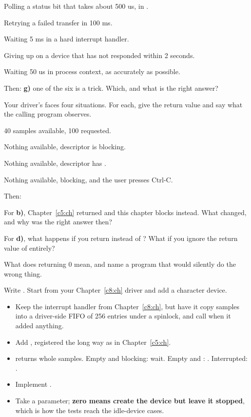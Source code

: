  Polling a status bit that takes about 500 us, in .

 Retrying a failed transfer in 100 ms.

 Waiting 5 ms in a hard interrupt handler.

 Giving up on a device that has not responded within 2 seconds.

 Waiting 50 us in process context, as accurately as possible.

Then: \textbf{g)} one of the six is a trick. Which, and what is the right answer?

\label{c9:ex:5}

Your driver's  faces four situations. For each, give the return value and say what the
calling program observes.

 40 samples available, 100 requested.

 Nothing available, descriptor is blocking.

 Nothing available, descriptor has .

 Nothing available, blocking, and the user presses Ctrl-C.

Then:

 For \textbf{b)}, Chapter~\ref{c5:ch} returned  and this chapter blocks
instead. What changed, and why was  the right answer then?

 For \textbf{d)}, what happens if you return  instead of ?
What if you ignore the return value of  entirely?

 What does returning 0 mean, and name a program that would silently do the wrong thing.

\label{c9:ex:6}

Write . Start from your Chapter~\ref{c8:ch} driver and add a
character device.
\begin{itemize}
  \item Keep the interrupt handler from Chapter~\ref{c8:ch}, but have it copy samples into a
    driver-side FIFO of 256 entries under a spinlock, and call  when it
    added anything.
  \item Add , registered the long way as in Chapter~\ref{c5:ch}.
  \item {} returns whole samples. Empty and blocking: wait. Empty and :
    . Interrupted: .
  \item Implement .
  \item Take a  parameter; \textbf{zero means create the device but leave it
    stopped}, which is how the tests reach the idle-device cases.
\end{itemize}

